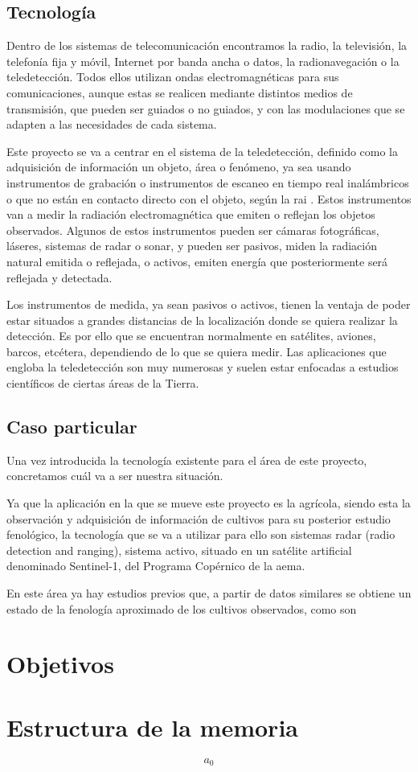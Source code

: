 \subsection{Tecnología}
\par Dentro de los sistemas de telecomunicación encontramos la radio, la televisión, la telefonía fija y móvil, Internet por banda ancha o datos, la radionavegación o la teledetección. Todos ellos utilizan ondas electromagnéticas para sus comunicaciones, aunque estas se realicen mediante distintos medios de transmisión, que pueden ser guiados o no guiados, y con las modulaciones que se adapten a las necesidades de cada sistema. 
\\
\par Este proyecto se va a centrar en el sistema de la teledetección, definido como la adquisición de información un objeto, área o fenómeno, ya sea usando instrumentos de grabación o instrumentos de escaneo en tiempo real inalámbricos o que no están en contacto directo con el objeto, según la \gls{rai} \cite{RAI}. Estos instrumentos van a medir la radiación electromagnética que emiten o reflejan los objetos observados. Algunos de estos instrumentos pueden ser cámaras fotográficas, láseres, sistemas de radar o sonar, y pueden ser pasivos, miden la radiación natural emitida o reflejada, o activos, emiten energía que posteriormente será reflejada y detectada.
\\
\par Los instrumentos de medida, ya sean pasivos o activos, tienen la ventaja de poder estar situados a grandes distancias de la localización donde se quiera realizar la detección. Es por ello que se encuentran normalmente en satélites, aviones, barcos, etcétera, dependiendo de lo que se quiera medir. Las aplicaciones que engloba la teledetección son muy numerosas y suelen estar enfocadas a estudios científicos de ciertas áreas de la Tierra. 
\subsection{Caso particular}
\par Una vez introducida la tecnología existente para el área de este proyecto, concretamos cuál va a ser nuestra situación. 
\\
\par Ya que la aplicación en la que se mueve este proyecto es la agrícola, siendo esta la observación y adquisición de información de cultivos para su posterior estudio fenológico, la tecnología que se va a utilizar para ello son sistemas radar (radio detection and ranging), sistema activo, situado en un satélite artificial denominado Sentinel-1, del Programa Copérnico de la \gls{aema}. 
\\
\par En este área ya hay estudios previos que, a partir de datos similares se obtiene un estado de la fenología aproximado de los cultivos observados, como son 
\section{Objetivos}

\section{Estructura de la memoria}
\begin{equation}
	a_{0}
	\label{eq:max}
\end{equation}


